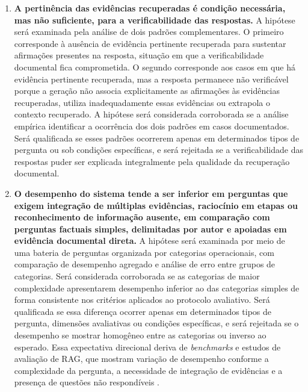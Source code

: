 \begin{enumerate}[label=\textbf{H\arabic*. }, leftmargin=*, widest=H3, align=left]
  \item \textbf{A pertinência das evidências recuperadas é condição necessária, mas não suficiente, para a verificabilidade das respostas.} A hipótese será examinada pela análise de dois padrões complementares. O primeiro corresponde à ausência de evidência pertinente recuperada para sustentar afirmações presentes na resposta, situação em que a verificabilidade documental fica comprometida. O segundo corresponde aos casos em que há evidência pertinente recuperada, mas a resposta permanece não verificável porque a geração não associa explicitamente as afirmações às evidências recuperadas, utiliza inadequadamente essas evidências ou extrapola o contexto recuperado. A hipótese será considerada corroborada se a análise empírica identificar a ocorrência dos dois padrões em casos documentados. Será qualificada se esses padrões ocorrerem apenas em determinados tipos de pergunta ou sob condições específicas, e será rejeitada se a verificabilidade das respostas puder ser explicada integralmente pela qualidade da recuperação documental.
  \item \textbf{O desempenho do sistema tende a ser inferior em perguntas que exigem integração de múltiplas evidências, raciocínio em etapas ou reconhecimento de informação ausente, em comparação com perguntas factuais simples, delimitadas por autor e apoiadas em evidência documental direta.} A hipótese será examinada por meio de uma bateria de perguntas organizada por categorias operacionais, com comparação de desempenho agregado e análise de erro entre grupos de categorias. Será considerada corroborada se as categorias de maior complexidade apresentarem desempenho inferior ao das categorias simples de forma consistente nos critérios aplicados ao protocolo avaliativo. Será qualificada se essa diferença ocorrer apenas em determinados tipos de pergunta, dimensões avaliativas ou condições específicas, e será rejeitada se o desempenho se mostrar homogêneo entre as categorias ou inverso ao esperado. Essa expectativa direcional deriva de \textit{benchmarks} e estudos de avaliação de RAG, que mostram variação de desempenho conforme a complexidade da pergunta, a necessidade de integração de evidências e a presença de questões não respondíveis \parencite{saadFalconEtAl2024ares,esEtAl2023ragas,zhuEtAl2025rageval,pipitoneAlami2024legalbenchRag}.

\end{enumerate}
